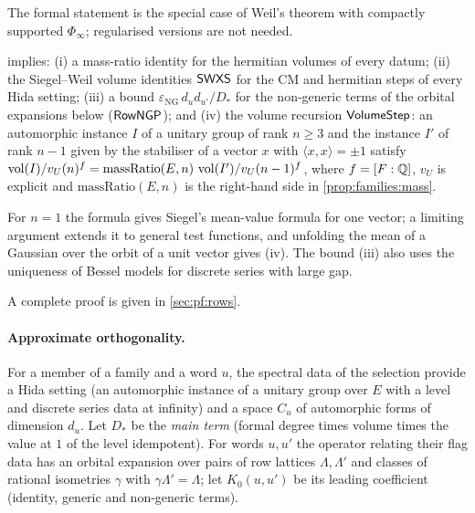 The formal statement is the special case of Weil's theorem with compactly supported $\Phi_\infty$; regularised
versions \cite{KudlaRallis1988,KudlaRallis1994,Ichino2004,Yamana2014} are not needed.

\begin{proposition}\Fmark\label{prop:families:volratio}
 implies: (i) a mass-ratio identity for the hermitian volumes of every datum;
(ii) the Siegel--Weil volume identities $\mathsf{SWXS}$ for the CM and hermitian steps of every Hida setting;
(iii) a bound $\varepsilon_{\mathrm{NG}}\,d_ud_{u'}/D_*$ for the non-generic terms of the orbital expansions
below ($\mathsf{RowNGP}$); and (iv) the volume recursion $\mathsf{VolumeStep}$: an automorphic instance $I$ of a
unitary group of rank $n\ge3$ and the instance $I'$ of rank $n-1$ given by the stabiliser of a vector $x$ with
$\langle x,x\rangle=\pm1$ satisfy $\operatorname{vol}(I)/v_U(n)^{f}=\mathrm{massRatio}(E,n)\,\operatorname{vol}(I')/v_U(n-1)^{f}$, where
$f=[F:\mathbb{Q}]$, $v_U$ is explicit and $\mathrm{massRatio}(E,n)$ is the right-hand side in \cref{prop:families:mass}.
\end{proposition}

\begin{proofoutline}
For $n=1$ the formula gives Siegel's mean-value formula for one vector; a limiting argument extends it to
general test functions, and unfolding the mean of a Gaussian over the orbit of a unit vector gives (iv). The
bound (iii) also uses the uniqueness of Bessel models for discrete series with large gap.

A complete proof is given in \cref{sec:pf:rows}.
\end{proofoutline}

\paragraph{Approximate orthogonality.}
For a member of a family and a word $u$, the spectral data of the selection provide a Hida setting (an
automorphic instance of a unitary group over $E$ with a level and discrete series data at infinity) and a space
$C_u$ of automorphic forms of dimension $d_u$. Let $D_*$ be the \emph{main term} (formal degree times volume times
the value at $1$ of the level idempotent). For words $u,u'$ the operator relating their flag data has an orbital
expansion over pairs of row lattices $\Lambda,\Lambda'$ and classes of rational isometries $\gamma$ with
$\gamma\Lambda'=\Lambda$; let $K_0(u,u')$ be its leading coefficient (identity, generic and non-generic terms).

